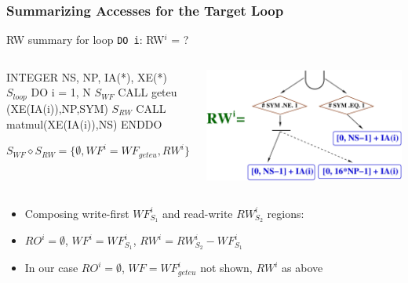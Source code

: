 \documentclass{beamer}
\renewcommand{\emph}[1]{\textcolor{structure}{#1}}
\newcommand{\emp}[1]{\textcolor{DikuRed}{ #1}}
\newcommand{\mymath}[1]{$ #1 $}
\newcommand{\myindx}[1]{_{#1}}
\newcommand{\myindu}[1]{^{#1}}
\begin{document}
\begin{frame}[fragile,t]
  \frametitle{Summarizing Accesses for the Target Loop}

\begin{block}{RW summary for loop {\tt DO i}: RW$^i$ = ? } \vspace{-1ex}
\begin{columns} 
\begin{colorcode}[fontsize=\scriptsize]
        INTEGER NS, NP, IA(*), XE(*)
\mymath{S\myindx{loop}}    \emph{DO i = 1, N}
\mymath{S\myindx{WF}}      CALL geteu (XE(IA(i)),NP,SYM)
\mymath{S\myindx{RW}}      CALL matmul(XE(IA(i)),NS)
        \emph{ENDDO}

\emp{\mymath{S\myindx{WF} \diamond S\myindx{RW} = \{\emptyset, WF\myindu{i}=WF\myindx{geteu}, RW\myindu{i}\}}}
\end{colorcode}
\begin{center}
\includegraphics[height=15ex]{Figures/RW_IND_XE}
\end{center}
\end{columns}
\end{block}

\bigskip

\begin{itemize}
    \item Composing write-first $WF^i_{S_1}$ and read-write $RW^i_{S_2}$ regions:  \smallskip
    \item $RO^i = \emptyset$, $WF^i = WF^i_{S_1}$, $RW^i = RW^i_{S_2} - WF^i_{S_1}$  \smallskip
    \item In our case $RO^i = \emptyset$, $WF = WF^i_{geteu}$ not shown, \emph{$RW^{i}$ as above}
\end{itemize}
\end{frame}


\end{document}
